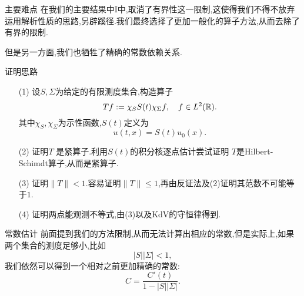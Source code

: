 \begin{frame}[t]{主要难点}
  在我们的主要结果中I中,取消了有界性这一限制,这使得我们不得不放弃运用解析性质的思路,另辟蹊径.我们最终选择了更加一般化的算子方法,从而去除了有界的限制.

  但是另一方面,我们也牺牲了精确的常数依赖关系.
\end{frame}

\begin{frame}[t]{证明思路}

\begin{enumerate}
  \item [(1)] 设$S,\Sigma$为给定的有限测度集合,构造算子
    \begin{equation}
      Tf:=\chi_{S} S(t)\chi_{\Sigma}f ,\quad f\in L^2(\mathbb{R}). 
    \end{equation}
    其中$\chi_S,\chi_\Sigma$为示性函数,$S(t)$定义为
   \begin{equation}
     u(t,x)=S(t)u_0(x).
   \end{equation}
\item [(2)] 证明$T$ 是紧算子.利用$S(t)$的积分核逐点估计尝试证明 $T$是Hilbert-Schimdt算子,从而是紧算子.
\item [(3)] 证明$\|T\|<1$.容易证明$\|T\|\le 1$,再由反证法及(2)证明其范数不可能等于$1$.
\item [(4)]  证明两点能观测不等式,由(3)以及KdV的守恒律得到.
\end{enumerate} 
\end{frame}

\begin{frame}[t]{常数估计}
  前面提到我们的方法限制,从而无法计算出相应的常数,但是实际上,如果两个集合的测度足够小,比如
  \[
  |S | | \Sigma|< 1,
  \] 
  我们依然可以得到一个相对之前更加精确的常数:
  \[
    C= \frac{C'(t)}{1-|S| |\Sigma|}.
  \] 
\end{frame}

